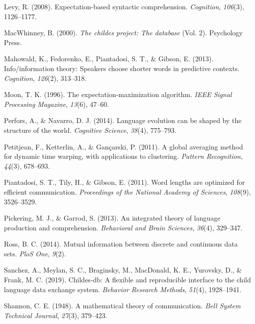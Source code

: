 \documentclass[man,floatsintext]{apa6}
\begin{document}
\leavevmode\hypertarget{ref-levy2008}{}%
Levy, R. (2008). Expectation-based syntactic comprehension. \emph{Cognition}, \emph{106}(3), 1126--1177.

\leavevmode\hypertarget{ref-macwhinney2000}{}%
MacWhinney, B. (2000). \emph{The childes project: The database} (Vol. 2). Psychology Press.

\leavevmode\hypertarget{ref-mahowald2013}{}%
Mahowald, K., Fedorenko, E., Piantadosi, S. T., \& Gibson, E. (2013). Info/information theory: Speakers choose shorter words in predictive contexts. \emph{Cognition}, \emph{126}(2), 313--318.

\leavevmode\hypertarget{ref-moon1996}{}%
Moon, T. K. (1996). The expectation-maximization algorithm. \emph{IEEE Signal Processing Magazine}, \emph{13}(6), 47--60.

\leavevmode\hypertarget{ref-perfors2014language}{}%
Perfors, A., \& Navarro, D. J. (2014). Language evolution can be shaped by the structure of the world. \emph{Cognitive Science}, \emph{38}(4), 775--793.

\leavevmode\hypertarget{ref-petitjean2011}{}%
Petitjean, F., Ketterlin, A., \& Gançarski, P. (2011). A global averaging method for dynamic time warping, with applications to clustering. \emph{Pattern Recognition}, \emph{44}(3), 678--693.

\leavevmode\hypertarget{ref-piantadosi2011}{}%
Piantadosi, S. T., Tily, H., \& Gibson, E. (2011). Word lengths are optimized for efficient communication. \emph{Proceedings of the National Academy of Sciences}, \emph{108}(9), 3526--3529.

\leavevmode\hypertarget{ref-pickering2013}{}%
Pickering, M. J., \& Garrod, S. (2013). An integrated theory of language production and comprehension. \emph{Behavioral and Brain Sciences}, \emph{36}(4), 329--347.

\leavevmode\hypertarget{ref-ross2014}{}%
Ross, B. C. (2014). Mutual information between discrete and continuous data sets. \emph{PloS One}, \emph{9}(2).

\leavevmode\hypertarget{ref-sanchez2019}{}%
Sanchez, A., Meylan, S. C., Braginsky, M., MacDonald, K. E., Yurovsky, D., \& Frank, M. C. (2019). Childes-db: A flexible and reproducible interface to the child language data exchange system. \emph{Behavior Research Methods}, \emph{51}(4), 1928--1941.

\leavevmode\hypertarget{ref-shannon1948}{}%
Shannon, C. E. (1948). A mathematical theory of communication. \emph{Bell System Technical Journal}, \emph{27}(3), 379--423.
\end{document}
